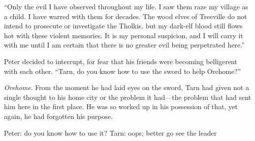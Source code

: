 ``Only the evil I have observed throughout my life.  I saw them raze my village as a child.  I have warred with them for decades.  The wood elves of Treeville do not intend to prosecute or investigate the Tholkis, but my dark-elf blood still flows hot with these violent memories.  It is my personal suspicion, and I will carry it with me until I am certain that there is no greater evil being perpetrated here.''

Peter decided to interrupt, for fear that his friends were becoming belligerent with each other.  ``Tarn, do you know how to use the sword to help Orehome?''

\emph{Orehome}.  From the moment he had laid eyes on the sword, Tarn had given not a single thought to his home city or the problem it had---the problem that had sent him here in the first place.  He was so worked up in his possession of \kildir that, yet again, he had forgotten his purpose.








Peter: do you know how to use it?
Tarn: oops; better go see the leader